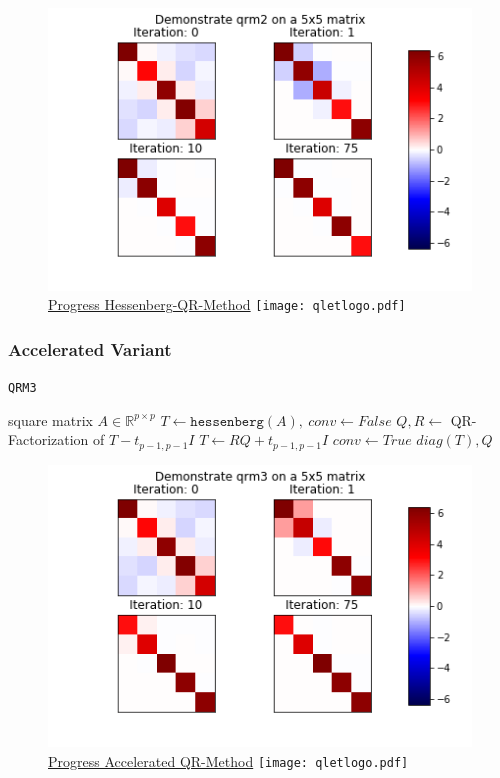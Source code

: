 \documentclass[12pt]{article}
\begin{document}
\begin{figure}
\begin{center}
\caption{\href {https://github.com/thsis/NIS18/tree/master/media/plots}{Progress Hessenberg-QR-Method}  \protect\texttt{[image: qletlogo.pdf]}}
  \includegraphics[scale=0.6]{../media/plots/qrm2.png}
\end{center}
\end{figure}


\subsubsection{Accelerated Variant}

\begin{algorithm}[H]
\begin{algorithmic}
\caption{\texttt{QRM3}}
\Require square matrix $A \in \mathbb{R}^{p \times p}$
\State $T \gets \texttt{hessenberg}(A),\ conv \gets False$
    \State $Q, R \gets$ QR-Factorization of $T - t_{p-1, p-1} I$
    \State $T \gets RQ + t_{p-1, p-1}I$
        \State $conv \gets True$
    \EndIf
\EndWhile
\Return $diag\left(T\right), Q$
\end{algorithmic}
\end{algorithm}

\begin{figure}
\begin{center}
\caption{\href {https://github.com/thsis/NIS18/tree/master/media/plots}{Progress Accelerated QR-Method}  \protect\texttt{[image: qletlogo.pdf]}}
  \includegraphics[scale=0.6]{../media/plots/qrm3.png}
\end{center}
\end{figure}
\end{document}
